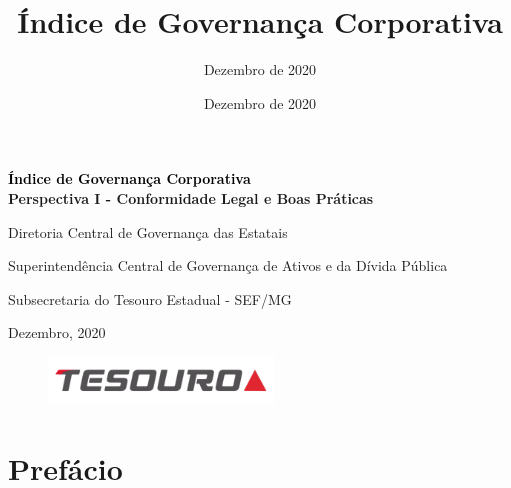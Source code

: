 


\title{Índice de Governança Corporativa}%
\date{Dezembro de 2020}%

\author{Dezembro de 2020}

%

%
%
\begin{titlepage}
\BgThispage
{}
\vspace*{0.30\textheight}
\noindent
\begin{center}
\textcolor{black}{{\Huge\textbf{Índice de Governança Corporativa}}\\ 
\vspace{20pt}}
\Large\textbf{Perspectiva I - Conformidade Legal e Boas Práticas}
\end{center}



\vspace{40pt}

\large{    
Diretoria Central de Governança das Estatais
    
Superintendência Central de Governança de Ativos e da Dívida Pública
    
Subsecretaria do Tesouro Estadual - SEF/MG}
    
\vspace{40pt}
    
Dezembro, 2020

\begin{figure}[b]    
\begin{flushright}
\includegraphics[width=60mm]{figures/logo-tesouro-peq.png}
\end{flushright}
\end{figure}
	
\end{titlepage}
\restoregeometry
%
	
\tableofcontents %
\clearpage
	
\chapter*{Prefácio}

